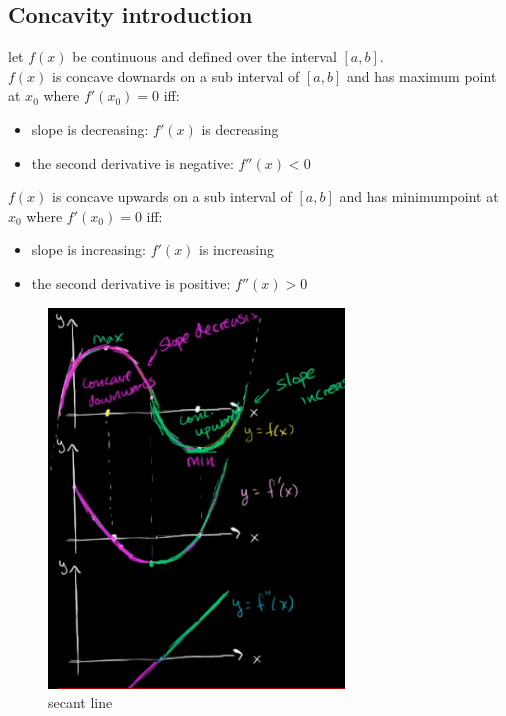 \documentclass{article}
\begin{document}
        \subsection{Concavity introduction}
            let \(f(x)\) be  continuous and defined over the interval \([a,b]\).\\ 
            \(f(x)\) is concave downards on a sub interval of \([a,b]\) and has maximum point at \(x_0\) where \(f'(x_0) = 0\) iff: 
            \begin{itemize}
                \item  slope is decreasing: \(f'(x)\) is decreasing
                \item  the second derivative is negative: \(f''(x) < 0 \)
            \end{itemize}
            \(f(x)\) is concave upwards on a sub interval of \([a,b]\) and has minimumpoint at \(x_0\) where \(f'(x_0) = 0\) iff: 
            \begin{itemize}
                \item  slope is increasing: \(f'(x)\) is increasing
                \item  the second derivative is positive: \(f''(x) > 0 \)
            \end{itemize}
            \begin{figure}[ht]
                \centering
                \includegraphics[bb=0 0 320 411, width=0.7\textwidth]{images/concavity.png}
                \caption{secant line}\label{fig:concavity}
            \end{figure}
\end{document}
